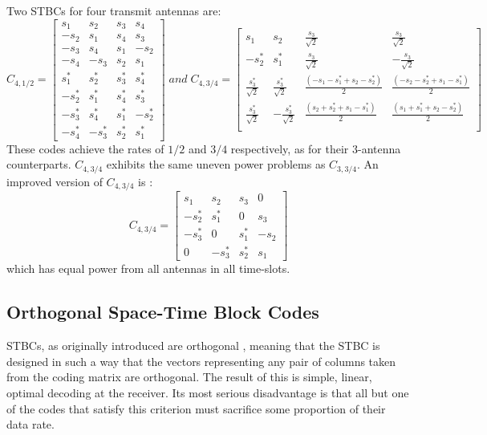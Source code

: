 \begin{itemize}
Two STBCs for four transmit antennas are:
\[
C_{4,1/2}= \left[\begin{array}{cccc}
s_1 & s_2 & s_3 & s_4\\
-s_2 & s_1 & s_4 & s_3\\
-s_3 & s_4 & s_1 & -s_2\\
-s_4 & -s_3 & s_2 & s_1\\
s^*_1 & s^*_2 & s^*_3 & s^*_4\\
-s^*_2 & s^*_1 & s^*_4 & s^*_3\\
-s^*_3 & s^*_4 & s^*_1 & -s^*_2\\
-s^*_4 & -s^*_3 & s^*_2 & s^*_1
\end{array} \right] \;and\; C_{4,3/4}=\left[\begin{array}{cccc}
s_1 & s_2 & \frac{s_3}{\sqrt{2}} & \frac{s_3}{\sqrt{2}}\\
-s^*_2 & s^*_1 & \frac{s_3}{\sqrt{2}} & -\frac{s_3}{\sqrt{2}}\\
\frac{s^*_3}{\sqrt{2}} & \frac{s^*_3}{\sqrt{2}} & \frac{(-s_1-s^*_1+s_2-s^*_2)}{2} & \frac{(-s_2-s^*_2+s_1-s^*_1)}{2}\\
\frac{s^*_3}{\sqrt{2}} & -\frac{s^*_3}{\sqrt{2}} & \frac{(s_2+s^*_2+s_1-s^*_1)}{2} & \frac{(s_1+s^*_1+s_2-s^*_2)}{2}\\
\end{array} \right]
\]
These codes achieve the rates of $1/2$ and $3/4$ respectively, as
for their 3-antenna counterparts. $C_{4,3/4}$ exhibits the same
uneven power problems as $C_{3,3/4}$. An improved version of
$C_{4,3/4}$ is \cite{19}:
\[
C_{4,3/4}=\left[\begin{array}{cccc}
s_1 & s_2 & s_3 & 0\\
-s^*_2 & s^*_1 & 0 & s_3\\
-s^*_3 & 0 & s^*_1 & -s_2\\
0 & -s^*_3 & s^*_2 & s_1
\end{array} \right]
\]
which has equal power from all antennas in all time-slots.
\end{itemize}
\subsection{Orthogonal Space-Time Block Codes}
STBCs, as originally introduced are orthogonal , meaning that the
STBC is designed in such a way that the vectors representing any
pair of columns taken from the coding matrix are orthogonal. The
result of this is simple, linear, optimal decoding at the receiver.
Its most serious disadvantage is that all but one of the codes that
satisfy this criterion must sacrifice some proportion of their data
rate.

